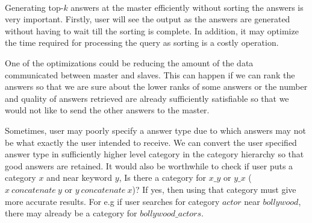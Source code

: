 \documentclass[11pt]{report}
\begin{document}
\paragraph*{}
Generating top-$k$ answers at the master efficiently without sorting the answers is very important. Firstly, user will see the output as the
answers are generated without having to wait till the sorting is complete. In addition, it may optimize the time required for processing the query as sorting
is a costly operation.

One of the optimizations could be reducing the amount of the data communicated between master and slaves. This can happen
if we can rank the answers so that we are sure about the lower ranks of some answers or the number and quality of answers retrieved are
already sufficiently satisfiable so that we would not like to send the other answers to the master. 

Sometimes, user may poorly specify a answer type due to which answers may not be what exactly the user intended to receive. We can convert
the user specified answer type in sufficiently higher level category in the category hierarchy so that good answers are retained.
It would also be worthwhile to check if user puts a category $x$ and near keyword $y$, Is there a category for $x\_y$ or $y\_x$ ($x\ concatenate\ y$ or $y\ concatenate\ x$)? 
If yes, then using that category must give more accurate results. For e.g if user searches for category $actor$ near $bollywood$, there may 
already be a category for $bollywood\_actors$.






\end{document}
